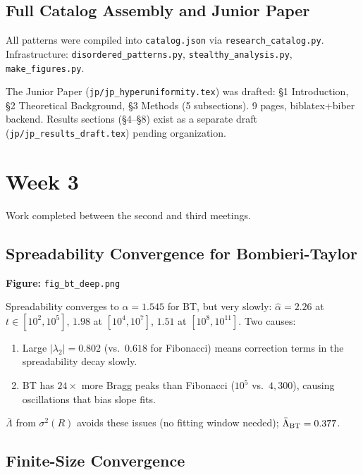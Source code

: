 \documentclass[11pt,letterpaper]{article}
\begin{document}
\subsection{Full Catalog Assembly and Junior Paper}

All patterns were compiled into \texttt{catalog.json} via \texttt{research\_catalog.py}.
Infrastructure: \texttt{disordered\_patterns.py}, \texttt{stealthy\_analysis.py},
\texttt{make\_figures.py}.

The Junior Paper (\texttt{jp/jp\_hyperuniformity.tex}) was drafted:
§1 Introduction, §2 Theoretical Background, §3 Methods (5 subsections).
9 pages, biblatex+biber backend. Results sections (§4--§8) exist as a separate draft
(\texttt{jp/jp\_results\_draft.tex}) pending organization.

\section{Week 3}

Work completed between the second and third meetings.

\subsection{Spreadability Convergence for Bombieri-Taylor}

\textbf{Figure:} \texttt{fig\_bt\_deep.png}

Spreadability converges to $\alpha = 1.545$ for BT, but very slowly:
$\hat\alpha = 2.26$ at $t \in [10^2, 10^5]$, $1.98$ at $[10^4, 10^7]$,
$1.51$ at $[10^8, 10^{11}]$. Two causes:
\begin{enumerate}[noitemsep]
  \item Large $|\lambda_2| = 0.802$ (vs.\ $0.618$ for Fibonacci) means correction
        terms in the spreadability decay slowly.
  \item BT has $24\times$ more Bragg peaks than Fibonacci ($10^5$ vs.\ $4{,}300$),
        causing oscillations that bias slope fits.
\end{enumerate}
$\bar\Lambda$ from $\sigma^2(R)$ avoids these issues (no fitting window needed);
$\bar\Lambda_{\rm BT} = 0.377$.

\subsection{Finite-Size Convergence}
\end{document}
